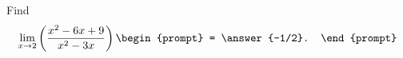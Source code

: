 \documentclass{ximera}
\author{Gregory Hartman \and Matthew Carr}
\begin{document}
\begin{exercise}



Find 
\[
\lim_{x\to2}\p{\frac{x^2-6x+9}{x^2-3x}}
\begin{prompt}
= \answer{-1/2}.
\end{prompt}
\]

\end{exercise}
\end{document}
